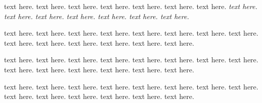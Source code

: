 \documentclass{article}
\begin{document}
text here. text here. text here. text here. text here. text here. text here.
\textit{text here. text here. text here. text here. text here. text here. text here. }

\begin{comment}
\begin{figure} 
\centering 
\PDIP(4){1/{E},2/B,3/NC,4/C}
\caption{NPN-Transistor, 4-pin PDIP package}
\label{fig:X_DIP4}
\end{comment}

text here. text here. text here. text here. text here. text here. text here.
text here. text here. text here. text here. text here. text here. text here.

\begin{comment} %
\begin{table}[tbh]%
\begin{tabular}{|c|c|c|}
\hline
\multirow[c]{7.5}{2cm}{\centering $\blacksquare(\alpha,0)$} & \multirow[c]{2}{*}{\centering \{10,00\}} & Alice $\autorightleftharpoons{10}{00}$ Bob \\ \cline{3-3} 
                                           &                            & Alice $\autorightleftharpoons{00}{10}$ Bob \\ \cline{2-3} 
                                           & \multirow[c]{2}{*}{\centering \{01,11\}} & Alice $\autorightleftharpoons{01}{11}$ Bob \\ \cline{3-3} 
                                           &                            & Alice $\autorightleftharpoons{11}{01}$ Bob \\ \hline
\end{tabular}
\end{table}
\end{comment}

text here. text here. text here. text here. text here. text here. text here.
text here. text here. text here. text here. text here. text here. text here.

\begin{comment}
\begin{table}[tbh]%
\centering
\begin{tabular}{l|c||r}
\toprule[3pt]
aaaaaa & bbbbb & \makecell[c]{ccccccc\\ggggg} \\ 
\midrule
\multicolumn{2}{c|}{dddeee} & fff\\ 
ddd & \multirow{4}{2cm}{\centering ddd}& fff\\ 
ddd & & fff\\ 
ddd && fff\\
ddd && fff\\  
\bottomrule
\bottomrule
\end{tabular}
\end{table}
\end{comment}

text here. text here. text here. text here. text here. text here. text here.
text here. text here. text here. text here. text here. text here. text here.
\end{document}
